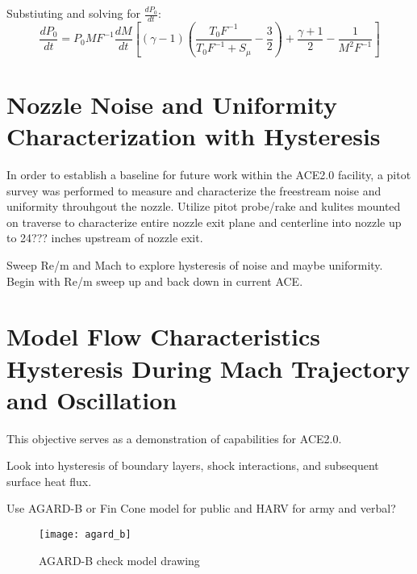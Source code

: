 Substiuting and solving for $\frac{dP_0}{dt}$:
\begin{equation}
    \frac{dP_0}{dt} = P_0 M F^{-1} \frac{dM}{dt} \left[ (\gamma-1) \left( \frac{T_0 F^{-1}}{T_0 F^{-1} + S_\mu} - \frac{3}{2} \right) + \frac{\gamma+1}{2} - \frac{1}{M^2 F^{-1}} \right]
\end{equation}

\section{Nozzle Noise and Uniformity Characterization with Hysteresis}

In order to establish a baseline for future work within the ACE2.0 facility, a pitot survey was performed to measure and characterize the freestream noise and uniformity throuhgout the nozzle. Utilize pitot probe/rake and kulites mounted on traverse to characterize entire nozzle exit plane and centerline into nozzle up to 24??? inches upstream of nozzle exit.

Sweep Re/m and Mach to explore hysteresis of noise and maybe uniformity. Begin with Re/m sweep up and back down in current ACE.

\section{Model Flow Characteristics Hysteresis During Mach Trajectory and Oscillation}

This objective serves as a demonstration of capabilities for ACE2.0. 

Look into hysteresis of boundary layers, shock interactions, and subsequent surface heat flux. 

Use AGARD-B or Fin Cone model for public and HARV for army and verbal?

\begin{figure}[ht]
    \centering
    \texttt{[image: agard\_b]}
    \caption{AGARD-B check model drawing}
    \label{fig:agard_b}
\end{figure}

